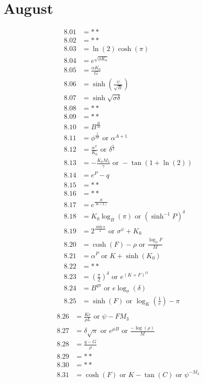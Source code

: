 \documentclass[12pt]{article}
\newcommand{\oder}{\text{ or }}
\begin{document}
\section{August}
\begin{align*}
8.01 &= **\\
8.02 &= **\\
8.03 &= \ln(2)\cosh(\pi)\\
8.04 &= e^{\sqrt{\phi K_{0}}}\\
8.05 &= \frac{\alpha K_{0}}{G}\\
8.06 &= \sinh\left(\frac{\psi}{\sqrt{B}}\right)\\
8.07 &= \sinh\sqrt{\sigma \delta}\\
8.08 &= **\\
8.09 &= **\\
8.10 &= B^{\frac{B}{M}} \\
8.11 &= \phi^{\frac{1}{2\rho}} \oder \alpha^{A + 1}\\
8.12 &= \frac{\alpha^{\psi}}{K_{0}} \oder \delta^{\frac{e}{2}}\\
8.13 &= -\frac{K_{0} M_{3}}{\gamma} \oder -\tan(1 + \ln(2))\\
8.14 &= e^{P} - q \\
8.15 &= **\\
8.16 &= **\\
8.17 &= e^{\frac{B}{\ln(2)}} \\
8.18 &= K_{0} \log_{B}(\pi) \oder \left(\sinh^{-1}P\right)^{\delta}\\
8.19 &= 2^{\frac{\sinh \alpha}{2}} \oder \sigma^{\psi} + K_{0}\\
8.20 &= \cosh(F) - \rho \oder \frac{\log_{\phi}F}{M}\\
8.21 &= \alpha^{P} \oder K+\sinh(K_{0}) \\
8.22 &= **\\
8.23 &= \left(\frac{\pi}{2}\right)^{\delta} \oder e^{(K + F)^{\Omega}}\\
8.24 &= B^{q \pi} \oder e \log_{\sigma}(\delta)\\
8.25 &= \sinh(F) \oder \log_{K}\left(\frac{1}{e}\right) - \pi\\
\end{align*}
\begin{align*}
8.26 &= \frac{K e}{\rho L} \oder \psi - F M_{3}\\
8.27 &= \delta \sqrt{\pi} \oder e^{\mu B} \oder \frac{-\log(\rho)}{M}\\
8.28 &= \frac{q - G}{\rho}\\
8.29 &= **\\
8.30 &= **\\
8.31 &= \cosh(F) \oder K - \tan(C) \oder \psi^{-M_{3}}\\
\end{align*}
\end{document}

